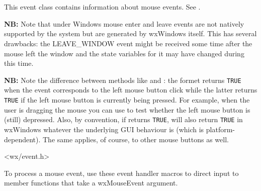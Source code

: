 \section{}\label{wxmouseevent}

This event class contains information about mouse events.
See .

{\bf NB: } Note that under Windows mouse enter and leave events are not natively supported
by the system but are generated by wxWindows itself. This has several
drawbacks: the LEAVE\_WINDOW event might be received some time after the mouse
left the window and the state variables for it may have changed during this
time.

{\bf NB: } Note the difference between methods like
 and
: the formet returns {\tt TRUE}
when the event corresponds to the left mouse button click while the latter
returns {\tt TRUE} if the left mouse button is currently being pressed. For
example, when the user is dragging the mouse you can use
 to test
whether the left mouse button is (still) depressed. Also, by convention, if
 returns {\tt TRUE},
 will also return {\tt TRUE} in
wxWindows whatever the underlying GUI behaviour is (which is
platform-dependent). The same applies, of course, to other mouse buttons as
well.




<wx/event.h>


To process a mouse event, use these event handler macros to direct input to member
functions that take a wxMouseEvent argument.

\twocolwidtha{7cm}
\begin{twocollist}\itemsep=0pt
\end{twocollist}%

